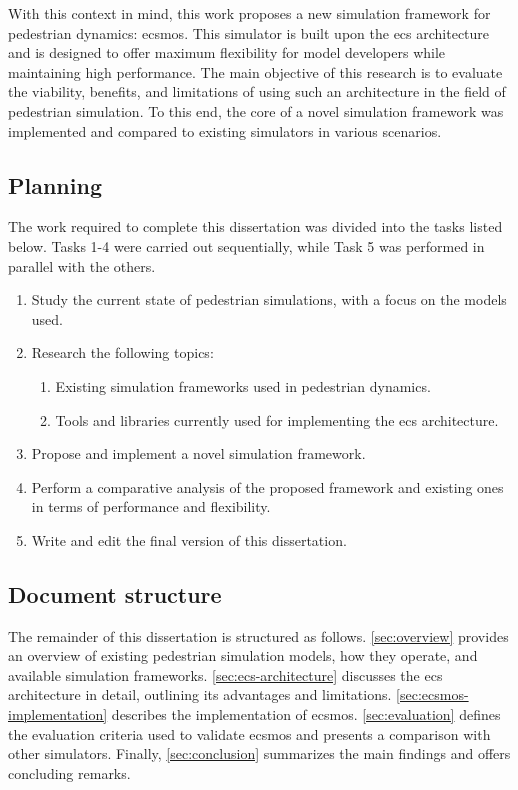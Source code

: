 \documentclass[twoside, 11pt]{article}
\begin{document}
With this context in mind, this work proposes a new simulation framework for pedestrian dynamics: \gls{ecsmos}. This simulator is built upon the \gls{ecs} architecture and is designed to offer maximum flexibility for model developers while maintaining high performance. The main objective of this research is to evaluate the viability, benefits, and limitations of using such an architecture in the field of pedestrian simulation. To this end, the core of a novel simulation framework was implemented and compared to existing simulators in various scenarios.

\subsection{Planning}

The work required to complete this dissertation was divided into the tasks listed below. Tasks 1-4 were carried out sequentially, while Task 5 was performed in parallel with the others.

\begin{enumerate}
  \item Study the current state of pedestrian simulations, with a focus on the models used.
  \item Research the following topics:
  \begin{enumerate}
    \item Existing simulation frameworks used in pedestrian dynamics.
    \item Tools and libraries currently used for implementing the \gls{ecs} architecture.
  \end{enumerate}
  \item Propose and implement a novel simulation framework.
  \item Perform a comparative analysis of the proposed framework and existing ones in terms of performance and flexibility.
  \item Write and edit the final version of this dissertation.
\end{enumerate}

\subsection{Document structure}

The remainder of this dissertation is structured as follows. \autoref{sec:overview} provides an overview of existing pedestrian simulation models, how they operate, and available simulation frameworks. \autoref{sec:ecs-architecture} discusses the \gls{ecs} architecture in detail, outlining its advantages and limitations. \autoref{sec:ecsmos-implementation} describes the implementation of \gls{ecsmos}. \autoref{sec:evaluation} defines the evaluation criteria used to validate \gls{ecsmos} and presents a comparison with other simulators. Finally, \autoref{sec:conclusion} summarizes the main findings and offers concluding remarks.
\end{document}
